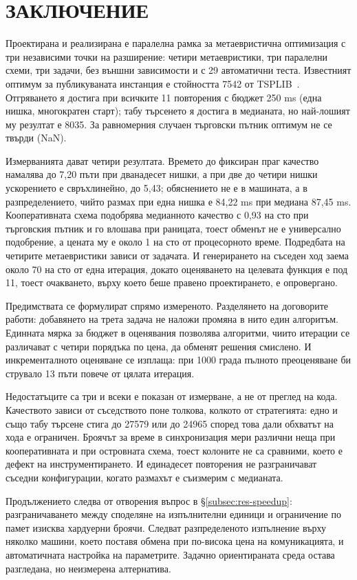 \section*{ЗАКЛЮЧЕНИЕ}
\label{sec:conclusion}

Проектирана и реализирана е паралелна рамка за метаевристична оптимизация с три независими точки на
разширение: четири метаевристики, три паралелни схеми, три задачи, без външни зависимости и с 29
автоматични теста. Известният оптимум за публикуваната инстанция  е стойността 7542 от
TSPLIB~\cite{reinelt1991tsplib}. Отгряването я достига при всичките 11 повторения с бюджет
250 ms (една нишка, многократен старт); табу търсенето я достига в медианата, но най-лошият му
резултат е 8035. За равномерния случаен търговски пътник оптимум не се твърди (NaN).

Измерванията дават четири резултата. Времето до фиксиран праг качество намалява до 7,20 пъти при
дванадесет нишки, а при две до четири нишки ускорението е свръхлинейно, до 5,43; обяснението не е в
машината, а в разпределението, чийто размах при една нишка е 84,22 ms при медиана 87,45 ms.
Кооперативната схема подобрява медианното качество с 0,93 на сто при търговския пътник и го влошава
при раницата, тоест обменът не е универсално подобрение, а цената му е около 1 на сто от
процесорното време. Подредбата на четирите метаевристики зависи от задачата. И генерирането на
съседен ход заема около 70 на сто от една итерация, докато оценяването на целевата функция е под
11, тоест очакването, върху което беше правено проектирането, е опровергано.

Предимствата се формулират спрямо измереното. Разделянето на договорите работи: добавянето на трета
задача не наложи промяна в нито един алгоритъм. Единната мярка за бюджет в оценявания позволява
алгоритми, чиито итерации се различават с четири порядъка по цена, да обменят решения смислено. И
инкременталното оценяване се изплаща: при 1000 града пълното преоценяване би струвало 13 пъти
повече от цялата итерация.

Недостатъците са три и всеки е показан от измерване, а не от преглед на кода. Качеството зависи от
съседството поне толкова, колкото от стратегията: едно и също табу търсене стига до 27579 или до
24965 според това дали обхватът на хода е ограничен. Броячът за време в синхронизация мери различни
неща при кооперативната и при островната схема, тоест колоните не са сравними, което е дефект на
инструментирането. И единадесет повторения не разграничават съседни конфигурации, когато размахът е
съизмерим с медианата.

Продължението следва от отворения въпрос в §\ref{subsec:res-speedup}: разграничаването между
споделяне на изпълнителни единици и ограничение по памет изисква хардуерни броячи. Следват
разпределеното изпълнение върху няколко машини, което поставя обмена при по-висока цена на
комуникацията, и автоматичната настройка на параметрите. Задачно ориентираната среда остава
разгледана, но неизмерена алтернатива.
